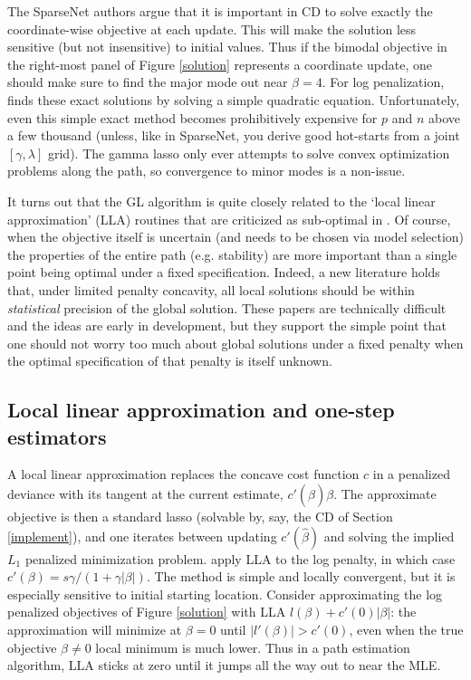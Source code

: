 \documentclass[12pt]{article}
\begin{document}
The SparseNet authors argue that it is important in CD  to solve exactly the
coordinate-wise objective at each update.  This will make the solution less
sensitive (but not insensitive) to initial values.  Thus if the bimodal
objective in the right-most panel of Figure \ref{solution} represents a
coordinate update, one should make sure to find the major mode out near
$\beta=4$. For log penalization, \cite{taddy_multinomial_2013} finds these
exact solutions by solving a simple quadratic equation.  Unfortunately, even
this simple exact method becomes prohibitively expensive for $p$ and $n$ above
a few thousand (unless, like in SparseNet, you 
derive good hot-starts from a joint $[\gamma,\lambda]$ grid).   The gamma lasso only ever attempts to solve convex
optimization problems along the path, so convergence to minor modes is a non-issue.

 It turns out that the GL algorithm is quite closely related to the `local
linear approximation' (LLA) routines that are criticized as sub-optimal in
\cite{mazumder_sparsenet_2011}.  Of course, when the objective itself is
uncertain (and needs to be chosen via model selection) the properties of the
entire path (e.g. stability) are more important than a single point being
optimal under a fixed specification.  Indeed,  a new literature
\citep{loh_regularized_2013,wang_optimal_2013}  holds that, under limited
penalty concavity, all local solutions  should be within {\it statistical}
precision of the global solution.  These papers are technically difficult and
the ideas are early in development, but they support the simple point that one
should not worry too much about global solutions under a fixed penalty when
the optimal specification of that penalty is itself unknown.

\subsection{Local linear approximation and one-step estimators}

A local linear approximation replaces the concave cost function $c$ in a
penalized deviance with its tangent at the current estimate,
$c'(\hat\beta)\beta$.  The approximate objective is then  a standard lasso
(solvable by, say, the CD of Section \ref{implement}), and one iterates
between updating $c'(\hat\beta)$ and solving the implied $L_1$ penalized
minimization problem. \citet{candes_enhancing_2008} apply LLA to the log
penalty, in which case $c'(\beta) = s \gamma / (1 + \gamma |\beta|)$.  The
method  is simple and locally convergent, but  it is especially sensitive to
initial starting location.  Consider approximating the log penalized
objectives of Figure \ref{solution} with LLA $l(\beta) + c'(0)|\beta|$:  the
approximation will minimize at $\beta=0$  until $|l'(\beta)| > c'(0)$, even
when the true objective $\beta\neq 0 $ local minimum is much lower. Thus in a
path estimation algorithm, LLA sticks at zero until it jumps all the way out
to near the MLE.
\end{document}
